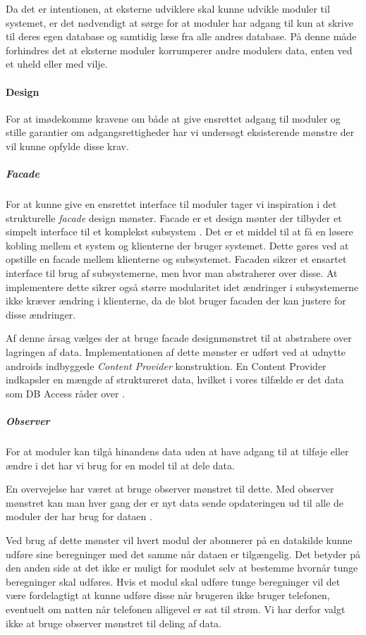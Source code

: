 Da det er intentionen, at eksterne udviklere skal kunne udvikle moduler til systemet, er det nødvendigt at sørge for at moduler har adgang til kun at skrive til deres egen database og samtidig læse fra alle andres database.
På denne måde forhindres det at eksterne moduler korrumperer andre modulers data, enten ved et uheld eller med vilje.

\paragraph{Design} 
For at imødekomme kravene om både at give ensrettet adgang til moduler og stille garantier om adgangsrettigheder har vi undersøgt eksisterende mønstre der vil kunne opfylde disse krav.

\subparagraph{Facade}
For at kunne give en ensrettet interface til moduler tager vi inspiration i det strukturelle \textit{facade} design mønster.
Facade er et design mønter der tilbyder et simpelt interface til et komplekst subsystem \citep{DATGANGOFFOUR}. 
Det er et middel til at få en løsere kobling mellem et system og klienterne der bruger systemet.
Dette gøres ved at opstille en facade mellem klienterne og subsystemet.
Facaden sikrer et ensartet interface til brug af subsystemerne, men hvor man abstraherer over disse.
At implementere dette sikrer også større modularitet idet ændringer i subsystemerne ikke kræver ændring i klienterne, da de blot bruger facaden der kan justere for disse ændringer.

Af denne årsag vælges der at bruge facade designmønstret til at abstrahere over lagringen af data.
Implementationen af dette mønster er udført ved at udnytte androids indbyggede \textit{Content Provider} konstruktion.
En Content Provider indkapsler en mængde af struktureret data, hvilket i vores tilfælde er det data som DB Access råder over \cite{contentprovider}.

\subparagraph{Observer}
For at moduler kan tilgå hinandens data uden at have adgang til at tilføje eller ændre i det har vi brug for en model til at dele data.

En overvejelse har været at bruge observer mønstret til dette.
Med observer mønstret kan man hver gang der er nyt data sende opdateringen ud til alle de moduler der har brug for dataen \cite[p.~244]{gamma1994design}.

Ved brug af dette mønster vil hvert modul der abonnerer på en datakilde kunne udføre sine beregninger med det samme når dataen er tilgængelig.
Det betyder på den anden side at det ikke er muligt for modulet selv at bestemme hvornår tunge beregninger skal udføres.
Hvis et modul skal udføre tunge beregninger vil det være fordelagtigt at kunne udføre disse når brugeren ikke bruger telefonen, eventuelt om natten når telefonen alligevel er sat til strøm.
Vi har derfor valgt ikke at bruge observer mønstret til deling af data.

